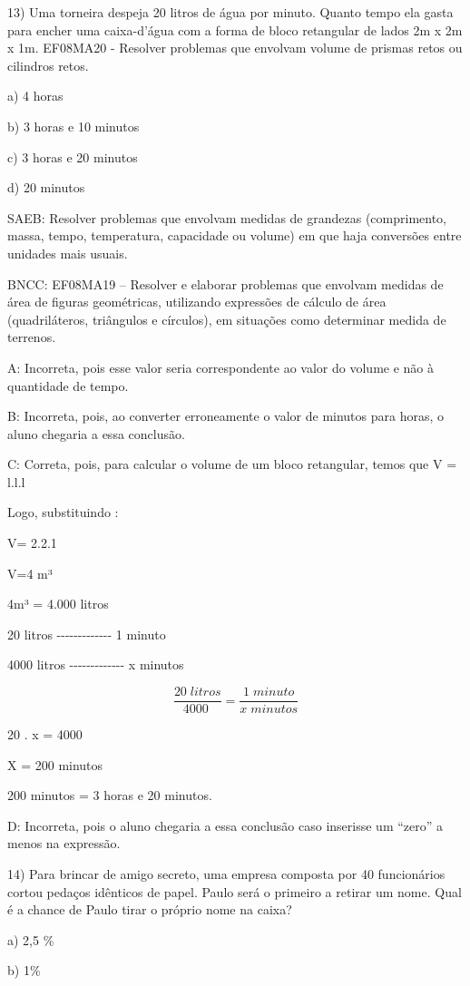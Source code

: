 13) Uma torneira despeja 20 litros de água por minuto. Quanto tempo ela
gasta para encher uma caixa-d'água com a forma de bloco retangular de
lados 2m x 2m x 1m. EF08MA20 - Resolver problemas que envolvam volume de
prismas retos ou cilindros retos.

a) 4 horas

b) 3 horas e 10 minutos

c) 3 horas e 20 minutos

d) 20 minutos

SAEB: Resolver problemas que envolvam medidas de grandezas (comprimento,
massa, tempo, temperatura, capacidade ou volume) em que haja conversões
entre unidades mais usuais.

BNCC: EF08MA19 -- Resolver e elaborar problemas que envolvam medidas de
área de figuras geométricas, utilizando expressões de cálculo de área
(quadriláteros, triângulos e círculos), em situações como determinar
medida de terrenos.

A: Incorreta, pois esse valor seria correspondente ao valor do volume e
não à quantidade de tempo.

B: Incorreta, pois, ao converter erroneamente o valor de minutos para
horas, o aluno chegaria a essa conclusão.

C: Correta, pois, para calcular o volume de um bloco retangular, temos
que V = l.l.l

Logo, substituindo :

V= 2.2.1

V=4 m³

4m³ = 4.000 litros

20 litros -\/-\/-\/-\/-\/-\/-\/-\/-\/-\/-\/-\/- 1 minuto

4000 litros -\/-\/-\/-\/-\/-\/-\/-\/-\/-\/-\/-\/- x minutos

\[\frac {20 \; litros}{4000 \;} = \frac {1 \; minuto}{x \; minutos}\]

20 . x = 4000

X = 200 minutos

200 minutos = 3 horas e 20 minutos.

D: Incorreta, pois o aluno chegaria a essa conclusão caso inserisse um
``zero'' a menos na expressão.

14) Para brincar de amigo secreto, uma empresa composta por 40
funcionários cortou pedaços idênticos de papel. Paulo será o primeiro a
retirar um nome. Qual é a chance de Paulo tirar o próprio nome na caixa?

a) 2,5 \%

b) 1\%

